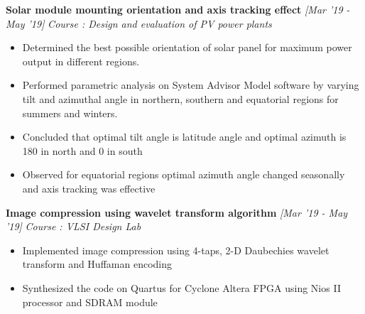 \documentclass[10 pt]{article}%
\begin{document}
{\begin{itemize}[leftmargin=*]
\end{itemize}
{\flushleft \textbf {\large{Solar module mounting orientation and axis tracking effect}} \hfill {{{\em{[Mar '19 - May '19]}}}}
\vspace{-0.8em}
{\flushleft \em{Course : Design and evaluation of PV power plants}}
\vspace{-5pt}
\begin{itemize}[leftmargin=*]
	\setlength\itemsep{1.5pt}
	\setlength\parskip{1.5pt}
  \item Determined the best possible orientation of solar panel for maximum power output in different regions.
\item Performed parametric analysis on System Advisor Model software by varying tilt and azimuthal angle in northern, southern and equatorial regions for summers and winters.
\item Concluded that optimal tilt angle is latitude angle and optimal azimuth is 180 in north and 0 in south
\item Observed for equatorial regions optimal azimuth angle changed seasonally and axis tracking was effective
\end{itemize}
{\flushleft \textbf {\large{Image compression using wavelet transform algorithm}} \hfill {{{\em{[Mar '19 - May '19]}}}}
	\vspace{-0.8em}
	{\flushleft \em{Course : VLSI Design Lab}}
	\vspace{-5pt}
	\begin{itemize}[leftmargin=*]
		\setlength\itemsep{1.5pt}
		\setlength\parskip{1.5pt}
		\item Implemented image compression using 4-taps, 2-D Daubechies wavelet transform and Huffaman encoding
		\item Synthesized the code on Quartus for Cyclone Altera FPGA using Nios II processor and SDRAM module

\end{itemize}}}}
\end{document}
